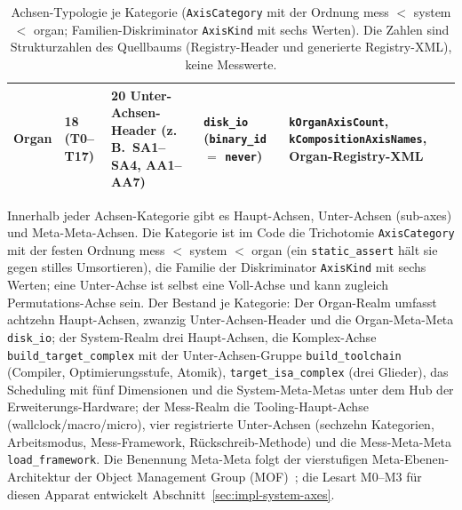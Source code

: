 \begin{nurlang}
\begin{table}[htbp]
\begin{tabular}{@{}lp{2.5cm}p{4.4cm}p{2.7cm}p{3.2cm}@{}}
Organ & 18 (T0--T17) & 20 Unter-Achsen-Header (z.\,B.\ SA1--SA4, AA1--AA7) & \texttt{disk\_io} (\texttt{binary\_id} $=$ \texttt{never}) & \texttt{kOrganAxisCount}, \texttt{kComposition\-AxisNames}, Organ-Registry-XML \\
\bottomrule
\end{tabular}
\caption{Achsen-Typologie je Kategorie (\texttt{AxisCategory} mit der Ordnung mess $<$ system $<$ organ;
Familien-Diskriminator \texttt{AxisKind} mit sechs Werten). Die Zahlen sind Strukturzahlen des Quellbaums
(Registry-Header und generierte Registry-XML), keine Messwerte.}\label{tab:axis-typology}
\end{table}
\end{nurlang}
\begin{nurkurz}
Innerhalb jeder Achsen-Kategorie gibt es Haupt-Achsen, Unter-Achsen (sub-axes) und Meta-Meta-Achsen. Die
Kategorie ist im Code die Trichotomie \texttt{AxisCategory} mit der festen Ordnung mess $<$ system $<$
organ (ein \texttt{static\_assert} hält sie gegen stilles Umsortieren), die Familie der Diskriminator
\texttt{AxisKind} mit sechs Werten; eine Unter-Achse ist selbst eine Voll-Achse und kann zugleich
Permutations-Achse sein. Der Bestand je Kategorie: Der Organ-Realm umfasst achtzehn Haupt-Achsen, zwanzig
Unter-Achsen-Header und die Organ-Meta-Meta \texttt{disk\_io}; der System-Realm drei Haupt-Achsen, die
Komplex-Achse \texttt{build\_target\_complex} mit der Unter-Achsen-Gruppe \texttt{build\_toolchain}
(Compiler, Optimierungsstufe, Atomik), \texttt{target\_isa\_complex} (drei Glieder), das Scheduling mit fünf
Dimensionen und die System-Meta-Metas unter dem Hub der Erweiterungs-Hardware; der Mess-Realm die
Tooling-Haupt-Achse (wallclock/macro/micro), vier registrierte Unter-Achsen (sechzehn Kategorien,
Arbeitsmodus, Mess-Framework, Rückschreib-Methode) und die Mess-Meta-Meta \texttt{load\_framework}. Die
Benennung Meta-Meta folgt der vierstufigen Meta-Ebenen-Architektur der Object Management Group
(MOF)~\cite{omg2016mof}; die Lesart M0--M3 für diesen Apparat entwickelt
Abschnitt~\ref{sec:impl-system-axes}.
\end{nurkurz}

